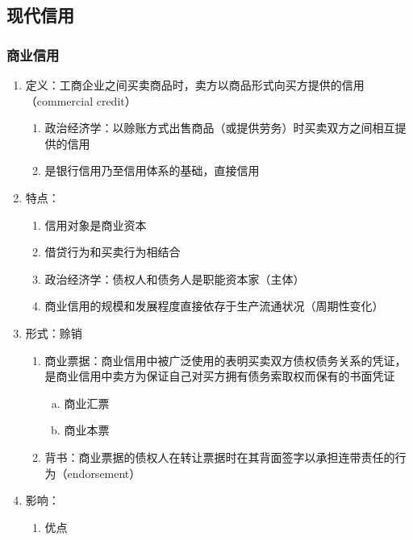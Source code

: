 \documentclass[12pt]{book}
\begin{document}
\subsection{现代信用}

\subsubsection{商业信用}


\begin{enumerate}[1.]
    \item 定义：工商企业之间买卖商品时，卖方以商品形式向买方提供的信用（commercial credit）
          \begin{enumerate}[(1)]
              \item 政治经济学：以赊账方式出售商品（或提供劳务）时买卖双方之间相互提供的信用
              \item 是银行信用乃至信用体系的基础，直接信用
          \end{enumerate}
    \item 特点：
          \begin{enumerate}[(1)]
              \item 信用对象是商业资本
              \item 借贷行为和买卖行为相结合
              \item 政治经济学：债权人和债务人是职能资本家（主体）
              \item 商业信用的规模和发展程度直接依存于生产流通状况（周期性变化）
          \end{enumerate}
    \item 形式：赊销
          \begin{enumerate}[(1)]
              \item  商业票据：商业信用中被广泛使用的表明买卖双方债权债务关系的凭证，是商业信用中卖方为保证自己对买方拥有债务索取权而保有的书面凭证
                    \begin{enumerate}[a.]
                        \item 商业汇票
                        \item 商业本票
                    \end{enumerate}
              \item  背书：商业票据的债权人在转让票据时在其背面签字以承担连带责任的行为（endorsement）
          \end{enumerate}
    \item 影响：
          \begin{enumerate}[(1)]
              \item 优点

\end{enumerate}
\end{enumerate}
\end{document}
